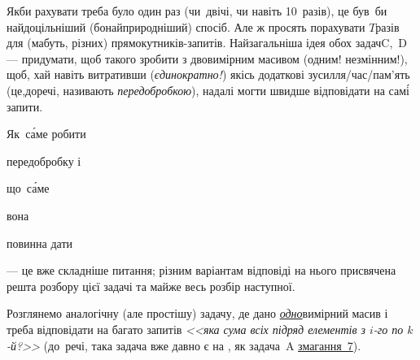 Якби рахувати треба було один раз (чи~двічі, чи навіть 10~разів), це був~би найдоцільніший (бо\nolinebreak[3] найприродніший) спосіб. Але ж просять порахувати $T$\nolinebreak[3] разів для (мабуть, різних) прямо\-кут\-ників-запитів. Найзагальніша ідея обох задач\nolinebreak[3] C,~D\nolinebreak[3] --- придумати, що\nolinebreak[3] б такого зробити з двовимірним масивом (одним! незмінним!), щоб, хай навіть витративши (\emph{єдинократно!}) якісь додаткові зусилля/\nolinebreak[2]час/\nolinebreak[2]пам'\-ять (це,\nolinebreak[2] до\nolinebreak[3] речі, називають \emph{перед\-оброб\-кою}), надалі могти швидше відповідати на сам\'{і} запити.
\begin{itshape}\begin{bfseries}{Як~с\'{а}ме робити}\end{bfseries} передобробку і \begin{bfseries}що~с\'{а}ме\end{bfseries} вона \begin{bfseries}повинна дати\end{bfseries}\end{itshape}\nolinebreak[3] --- це вже складніше питання; різним варіантам відповіді на нього присвячена решта розбору цієї задачі та майже весь розбір наступної.

Розглянемо аналогічну (але простішу) задачу, де дано \underline{\emph{одно}}\-вимір\-ний масив і треба відповідати на багато запитів \textsl{<<яка сума всіх підряд елементів з \mbox{$i$-го} по \mbox{$k$-й}?>>} (до~речі, така задача вже давно є на \EjudgeCkipoName, як задача~A \href{https://ejudge.ckipo.edu.ua/cgi-bin/register?action=212&contest_id=7&locale_id=2}{змагання~7}). 

